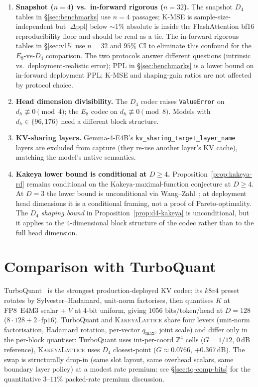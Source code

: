 \documentclass[10pt,a4paper]{article}
\theoremstyle{definition}
\theoremstyle{plain}
\newcommand{\Z}{\mathbb{Z}}
\newcommand{\abs}[1]{\left\lvert#1\right\rvert}
\begin{document}
\begin{enumerate}[leftmargin=*]
  \item \textbf{Snapshot ($n=4$) vs.\ in-forward rigorous ($n=32$).}
    The snapshot $D_4$ tables in \S\ref{sec:benchmarks} use
    $n=4$ passages; K-MSE is sample-size-independent but
    $\abs{\Delta\text{ppl}}$ below $\sim\!1\%$ absolute is inside
    the FlashAttention bf16 reproducibility floor and should be
    read as a tie. The in-forward rigorous tables in
    \S\ref{sec:v15} use $n=32$ and $95\%$ CI to eliminate this
    confound for the $E_8$-vs-$D_4$ comparison. The two protocols
    answer different questions (intrinsic vs.\ deployment-realistic
    error); PPL in \S\ref{sec:benchmarks} is a lower bound on
    in-forward deployment PPL; K-MSE and shaping-gain ratios are
    not affected by protocol choice.

  \item \textbf{Head dimension divisibility.} The $D_4$ codec
    raises \texttt{ValueError} on $d_h \not\equiv 0 \pmod 4$; the
    $E_8$ codec on $d_h \not\equiv 0 \pmod 8$. Models with
    $d_h \in \{96, 176\}$ need a different block structure.

  \item \textbf{KV-sharing layers.} Gemma-4-E4B's
    \texttt{kv\_sharing\_target\_layer\_name} layers are excluded
    from capture (they re-use another layer's KV cache), matching
    the model's native semantics.

  \item \textbf{Kakeya lower bound is conditional at $D\geq 4$.}
    Proposition~\ref{prop:kakeya-rd} remains conditional on the
    Kakeya-maximal-function conjecture at $D\geq 4$. At $D=3$ the
    lower bound is unconditional via Wang--Zahl~\cite{wang-zahl}; at
    deployment head dimensions it is a conditional framing, not a
    proof of Pareto-optimality. The \emph{$D_4$ shaping bound} in
    Proposition~\ref{prop:d4-kakeya} is unconditional, but it
    applies to the $4$-dimensional block structure of the codec
    rather than to the full head dimension.
\end{enumerate}

\section{Comparison with TurboQuant}
\label{sec:tq-comparison}

TurboQuant~\cite{turboquant-vllm,vllm-pr-38479} is the strongest
production-deployed KV codec; its $k8v4$ preset rotates by
Sylvester--Hadamard, unit-norm factorises, then quantises $K$ at
FP8~E4M3 scalar + $V$ at 4-bit uniform, giving $1056$
bits/token/head at $D=128$ ($8\cdot 128 + 2\cdot\mathrm{fp16}$).
TurboQuant and \textsc{KakeyaLattice} share four levers (unit-norm
factorisation, Hadamard rotation, per-vector $q_\mathrm{max}$,
joint scale) and differ only in the per-block quantiser:
TurboQuant uses int-per-coord $\Z^4$ cells ($G=1/12$, $0\,$dB
reference), \textsc{KakeyaLattice} uses $D_4$ closest-point
($G\approx 0.0766$, $+0.367\,$dB). The swap is structurally
drop-in (same slot layout, same overhead scalars, same boundary
layer policy) at a modest rate premium: see
\S\ref{sec:tq-comp-bits} for the quantitative $3$--$11\%$
packed-rate premium discussion.
\end{document}
